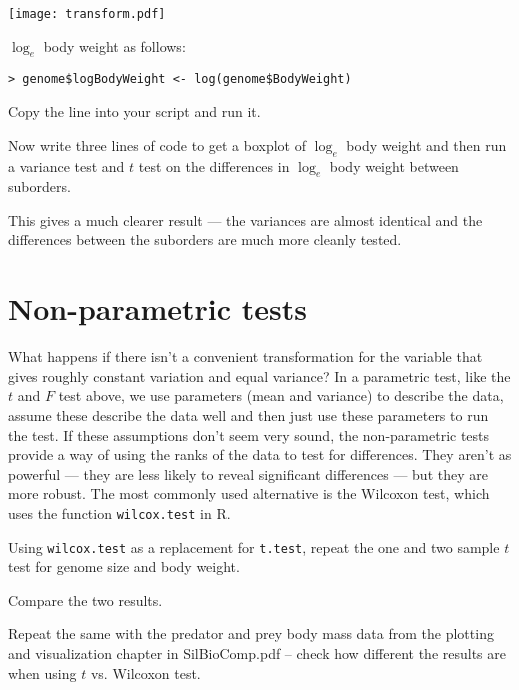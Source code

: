 \begin{center}
\texttt{[image: transform.pdf]} 
\end{center}

$\log_e$ body weight as follows:

\begin{lstlisting}
> genome$logBodyWeight <- log(genome$BodyWeight)
\end{lstlisting}


\begin{compactitem}[$\quad\star$]
\item Copy the line into your script and run it.
\item Now write three lines of code to get a boxplot of $\log_e$ body 
weight and then run a variance test and $t$ test on the differences in 
$\log_e$ body weight between suborders.
\end{compactitem}

This gives a much clearer result --- the variances are almost identical 
and the differences between the suborders are much more cleanly tested.

 
\section{Non-parametric tests}

What happens if there isn't a convenient transformation for the 
variable that gives roughly constant variation and equal variance?  In 
a parametric test, like the $t$ and $F$ test above, we use parameters 
(mean and variance) to describe the data, assume these describe the 
data well and then just use these parameters to run the test. If these 
assumptions don't seem very sound, the non-parametric tests provide a 
way of using the ranks of the data to test for differences. They aren't 
as powerful --- they are less likely to reveal significant differences 
--- but they are more robust. The most commonly used alternative is the 
Wilcoxon test, which uses the function {\tt wilcox.test} in R.

\begin{compactitem}[$\quad\star$]

\item Using {\tt wilcox.test} as a replacement for {\tt t.test}, repeat 
the one and two sample $t$ test for genome size and body weight.
\item Compare the two results.
\item Repeat the same with the predator and prey body mass data from 
the plotting and visualization chapter in SilBioComp.pdf -- check how 
different the results are when using $t$ vs. Wilcoxon test.

\end{compactitem}
